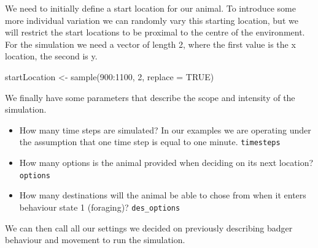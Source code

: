 \documentclass[10pt,a4paper]{article}
\newenvironment{Shaded}{}{}
\newcommand{\AttributeTok}[1]{#1}
\newcommand{\ConstantTok}[1]{#1}
\newcommand{\DecValTok}[1]{#1}
\newcommand{\FunctionTok}[1]{#1}
\newcommand{\NormalTok}[1]{#1}
\newcommand{\OtherTok}[1]{#1}
\newcommand{\SpecialCharTok}[1]{#1}
\providecommand{\tightlist}{%
  \setlength{\itemsep}{0pt}\setlength{\parskip}{0pt}}
\begin{document}
We need to initially define a start location for our animal.
To introduce some more individual variation we can randomly vary this starting location, but we will restrict the start locations to be proximal to the centre of the environment.
For the simulation we need a vector of length 2, where the first value is the x location, the second is y.

\begin{Shaded}
\begin{Highlighting}[]
\NormalTok{startLocation }\OtherTok{\textless{}{-}} \FunctionTok{sample}\NormalTok{(}\DecValTok{900}\SpecialCharTok{:}\DecValTok{1100}\NormalTok{, }\DecValTok{2}\NormalTok{, }\AttributeTok{replace =} \ConstantTok{TRUE}\NormalTok{)}
\end{Highlighting}
\end{Shaded}

We finally have some parameters that describe the scope and intensity of the simulation.

\begin{itemize}
\tightlist
\item
  How many time steps are simulated? In our examples we are operating under the assumption that one time step is equal to one minute.
  \texttt{timesteps}
\item
  How many options is the animal provided when deciding on its next location?
  \texttt{options}
\item
  How many destinations will the animal be able to chose from when it enters behaviour state 1 (foraging)?
  \texttt{des\_options}
\end{itemize}

We can then call all our settings we decided on previously describing badger behaviour and movement to run the simulation.
\end{document}

